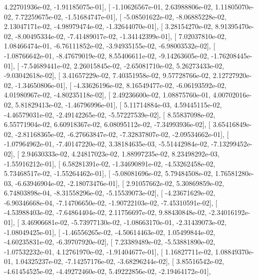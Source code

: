 \documentclass{article}
\begin{document}
          4.22701936e-02,  -1.91185075e-01],
       [ -1.10626567e-01,   2.63988806e-02,   1.11805070e-02,
          7.72259675e-02,  -1.51684747e-01],
       [ -5.08501622e-02,  -8.06885228e-02,   2.13047171e-02,
         -4.98979474e-02,  -1.32644070e-01],
       [  3.28154270e-02,   8.91395470e-02,  -8.00495334e-02,
         -7.41489017e-02,  -1.34142399e-01],
       [  7.02037810e-02,   1.08466474e-01,  -6.76111852e-02,
         -3.94935155e-02,  -6.98003532e-02],
       [ -1.08766642e-01,  -8.47679019e-02,   8.55406611e-02,
         -9.14263605e-02,  -1.76208445e-01],
       [ -7.54689441e-02,   2.26015845e-02,  -2.65081710e-02,
          5.26273433e-02,  -9.03042618e-02],
       [  3.41657229e-02,   7.40351958e-02,   9.57728766e-02,
          2.12727920e-02,  -1.34650806e-01],
       [ -4.33626196e-02,   8.16549477e-02,  -6.06193592e-02,
          4.01980967e-02,  -4.80235118e-02],
       [  2.49236600e-02,   1.08875760e-01,   4.00702016e-02,
          5.81829413e-02,  -1.46796996e-01],
       [  5.11714884e-03,   4.59445115e-02,  -4.46579031e-02,
         -2.49142265e-02,  -5.57227539e-02],
       [  8.55837098e-02,   6.55771904e-02,   6.60918367e-02,
          6.08095112e-02,  -7.34993936e-02],
       [  3.65416849e-02,  -2.81168365e-02,  -6.27663847e-02,
         -7.32837807e-02,  -2.09534662e-01],
       [ -1.07964962e-01,  -7.40147220e-02,   3.38184635e-03,
         -5.51442984e-02,  -7.13299452e-02],
       [  2.94630333e-02,   4.24817023e-02,   1.88997235e-02,
          8.23498292e-03,  -1.55916212e-01],
       [  6.58281391e-02,  -1.34690891e-02,  -4.53262458e-02,
          5.73468517e-02,  -1.55264462e-01],
       [ -5.08081696e-02,   5.79484508e-02,   1.76581280e-03,
         -6.63946904e-02,  -2.18073476e-01],
       [  2.91057662e-02,   5.30869859e-02,   6.74803898e-04,
         -8.31558296e-02,  -5.15539073e-02],
       [ -4.23671629e-02,  -6.90346668e-04,  -7.14706650e-02,
         -1.90722103e-02,  -7.45310591e-02],
       [ -4.53988403e-02,  -7.64864404e-02,   2.11756697e-02,
          9.88430848e-02,  -2.34016192e-01],
       [  3.46906681e-02,  -5.73977130e-02,  -1.08663170e-01,
         -2.31439073e-02,  -1.08049425e-01],
       [ -1.46556265e-02,  -4.50614463e-02,   1.05499844e-02,
         -4.60235831e-02,  -6.39707920e-02],
       [  7.23389489e-02,  -5.53881890e-02,  -1.07532232e-01,
          4.12761970e-02,  -1.91404677e-01],
       [  1.16827711e-02,   1.08849370e-01,   1.04325237e-02,
         -7.14257176e-02,  -3.68296244e-02],
       [  3.85516542e-02,  -4.61454525e-02,  -4.49272460e-02,
          5.49222856e-02,  -2.19464172e-01],
\end{document}

